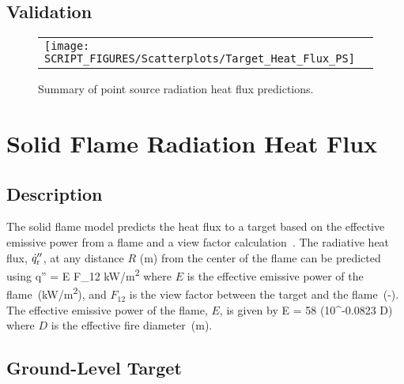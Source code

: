 \clearpage


\subsection*{Validation}

\begin{figure}[!ht]
\begin{center}
\begin{tabular}{l}
\texttt{[image: SCRIPT\_FIGURES/Scatterplots/Target\_Heat\_Flux\_PS]}
\end{tabular}
\end{center}
\caption[Summary of point source radiation heat flux predictions]
{Summary of point source radiation heat flux predictions.}
\label{Heat_Flux_Point_Source_Summary}
\end{figure}


\clearpage


\section{Solid Flame Radiation Heat Flux}

\subsection*{Description}

The solid flame model predicts the heat flux to a target based on the effective emissive power from a flame and a view factor calculation~\cite{Beyler2:SFPE}.
The radiative heat flux, $\dot q''\sb{r}$, at any distance $R$ (\si{m}) from the center of the flame can be predicted using
\be
\dot q'' = E F_{12} \quad \si{kW/m^2}
\label{eq:solid_flame}
\ee
where $E$ is the effective emissive power of the flame~(\si{kW/m^2}), and $F_{12}$ is the view factor between the target and the flame~(-).
The effective emissive power of the flame, $E$, is given by
\be
E = 58 (10^{-0.0823 D})
\label{eq:solid_flame_E}
\ee
where $D$ is the effective fire diameter~(\si{m}).

\subsection*{Ground-Level Target}

